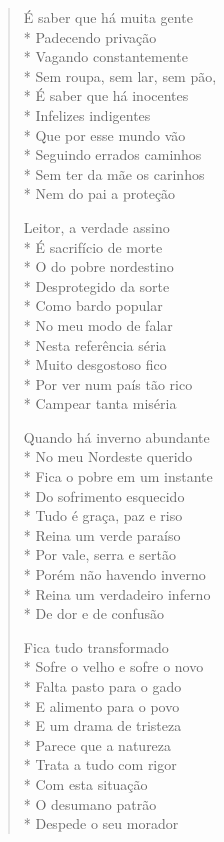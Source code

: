 \begin{verse}
É saber que há muita gente\\*
Padecendo privação\\*
Vagando constantemente\\*
Sem roupa, sem lar, sem pão,\\*
É saber que há inocentes\\*
Infelizes indigentes\\*
Que por esse mundo vão\\*
Seguindo errados caminhos\\*
Sem ter da mãe os carinhos\\*
Nem do pai a proteção

Leitor, a verdade assino\\*
É sacrifício de morte\\*
O do pobre nordestino\\*
Desprotegido da sorte\\*
Como bardo popular\\*
No meu modo de falar\\*
Nesta referência séria\\*
Muito desgostoso fico\\*
Por ver num país tão rico\\*
Campear tanta miséria

Quando há inverno abundante\\*
No meu Nordeste querido\\*
Fica o pobre em um instante\\*
Do sofrimento esquecido\\*
Tudo é graça, paz e riso\\*
Reina um verde paraíso\\*
Por vale, serra e sertão\\*
Porém não havendo inverno\\*
Reina um verdadeiro inferno\\*
De dor e de confusão

Fica tudo transformado\\*
Sofre o velho e sofre o novo\\*
Falta pasto para o gado\\*
E alimento para o povo\\*
E um drama de tristeza\\*
Parece que a natureza\\*
Trata a tudo com rigor\\*
Com esta situação\\*
O desumano patrão\\*
Despede o seu morador


\end{verse}
